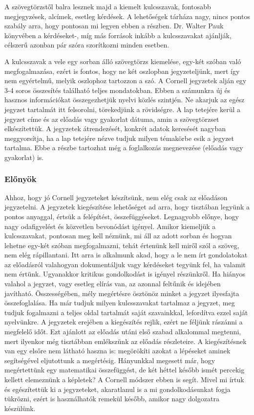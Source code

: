 \documentclass[../Main.tex]{subfiles}
\begin{document}
A szövegtörzstől balra lesznek majd a
kiemelt kulcsszavak, fontosabb megjegyzések,
alcímek, esetleg kérdések. A lehetőségek
tárháza nagy, nincs pontos szabály arra, hogy
pontosan mi legyen ebben a részben. Dr. Walter
Pauk könyvében a kérdéseket-, míg más források 
inkább a kulcsszavakat ajánlják, célszerű azonban
pár szóra szorítkozni minden esetben.



A kulcsszavak a vele egy sorban álló szövegtörzs kiemelése, egy-két szóban való
megfogalmazása, ezért is fontos, hogy ne két oszlopban jegyzeteljünk, mert így nem
egyértelmű, melyik oszlophoz tartozzon a szó.
 A Cornell jegyzetek alján egy 3-4 soros összesítés található teljes mondatokban. Ebben
a számunkra új és hasznos információkat összegezhetjük nyelvi közlés szintjén. Ne
akarjuk az egész jegyzet tartalmát itt felsorolni, törekedjünk a rövidségre.
A lap tetejére kerül a jegyzet címe és az előadás vagy gyakorlat dátuma, amin a
szövegtörzset elkészítettük. A jegyzetek átrendezését, konkrét adatok keresését nagyban
meggyorsítja, ha a lap tetejére nézve tudjuk milyen témakörbe esik a jegyzet tartalma.
Ebbe a részbe tartozhat még a foglalkozás megnevezése (előadás vagy gyakorlat) is.


\subsubsection{Előnyök}


Ahhoz, hogy jó Cornell jegyzeteket készítsünk, nem elég csak az előadáson jegyzetelni.
A jegyzetek kiegészítése lehetőséget ad arra, hogy tisztában legyünk a pontos anyaggal,
értsük a felépítést, összefüggéseket. Legnagyobb előnye, hogy nagy odafigyelést és
közvetlen bevonódást igényel. Amikor kiemeljük a kulcsszavakat, pontosan meg kell
néznünk, mi áll az adott sorban és hogyan lehetne egy-két szóban megfogalmazni, tehát
értenünk kell miről szól a szöveg, nem elég rápillantani. Itt arra is alkalmunk akad, hogy a
le nem írt gondolatokat az előadásról valahogyan dokumentáljuk vagy kérdéseket tegyünk
fel, ha valamit nem értünk. Ugyanakkor kritikus gondolkodást is igényel részünkről. Ha
hiányos valahol a jegyzet, vagy esetleg elírás van, az azonnal feltűnik és idejében
javítható. Összességében, mély megértésre ösztönöz minket a jegyzet ilyesfajta
összefoglalása. Ha már tudjuk milyen kulcsszavakat tartalmaz a jegyzet, meg tudjuk
fogalmazni a teljes oldal tartalmát saját szavainkkal, lefordítva ezzel saját nyelvünkre.
A jegyzetek erejében a kiegészítés rejlik, ezért ne féljünk rászánni a megfelelő időt. Ezt
ajánlott az előadás utáni első szabad alkalommal megtenni, mert ilyenkor még tisztábban
emlékszünk az előadás részleteire. A kiegészítésnek van egy elsőre nem látható haszna is:
megörökíti azokat a lépéseket aminek segítségével eljutottunk a megértésig. Hányunkkal
megesett már, hogy megértettünk egy matematikai összefüggést, de két héttel később
ismét percekig kellett elemeznünk a képletek? A Cornell módszer ebben is segít. Mivel mi
írtuk és egészítettük ki a jegyzeteket, akaratlanul is a mi gondolkodásunkat fogja tükrözni,
ezért is használhatók remekül később, amikor nagy dolgozatra készülünk.
\end{document}
